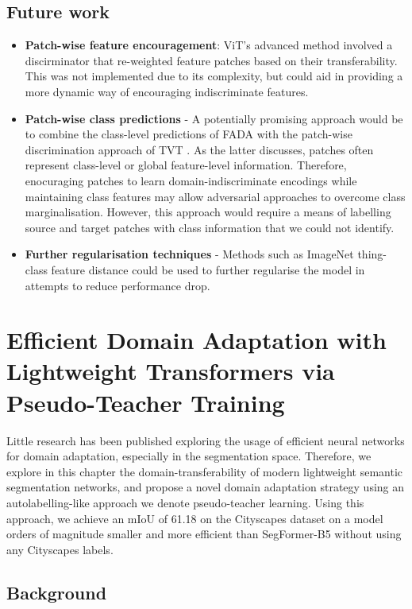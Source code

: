 \documentclass[a4paper,12pt]{report}
\begin{document}
\section{Future work}
\begin{itemize}
    \item \textbf{Patch-wise feature encouragement}: ViT's advanced method involved a discirminator that re-weighted feature patches based on their transferability. This was not implemented due to its complexity, but could aid in providing a more dynamic way of encouraging indiscriminate features.
    \item \textbf{Patch-wise class predictions} - A potentially promising approach would be to combine the class-level predictions of FADA \cite{wang_classes_2020} with the patch-wise discrimination approach of TVT \cite{yang_tvt_2021}. As the latter discusses, patches often represent class-level or global feature-level information. Therefore, enocuraging patches to learn domain-indiscriminate encodings while maintaining class features may allow adversarial approaches to overcome class marginalisation. However, this approach would require a means of labelling source and target patches with class information that we could not identify.
    \item \textbf{Further regularisation techniques} - Methods such as ImageNet thing-class feature distance \cite{hoyer_daformer_2022} could be used to further regularise the model in attempts to reduce performance drop.
\end{itemize}

\chapter{Efficient Domain Adaptation with Lightweight Transformers via Pseudo-Teacher Training}

Little research has been published exploring the usage of efficient neural networks for domain adaptation, especially in the segmentation space. Therefore, we explore in this chapter the domain-transferability of modern lightweight semantic segmentation networks, and propose a novel domain adaptation strategy using an autolabelling-like approach we denote pseudo-teacher learning. Using this approach, we achieve an mIoU of 61.18 on the Cityscapes dataset on a model orders of magnitude smaller and more efficient than SegFormer-B5 without using any Cityscapes labels.

\section{Background}
\end{document}
